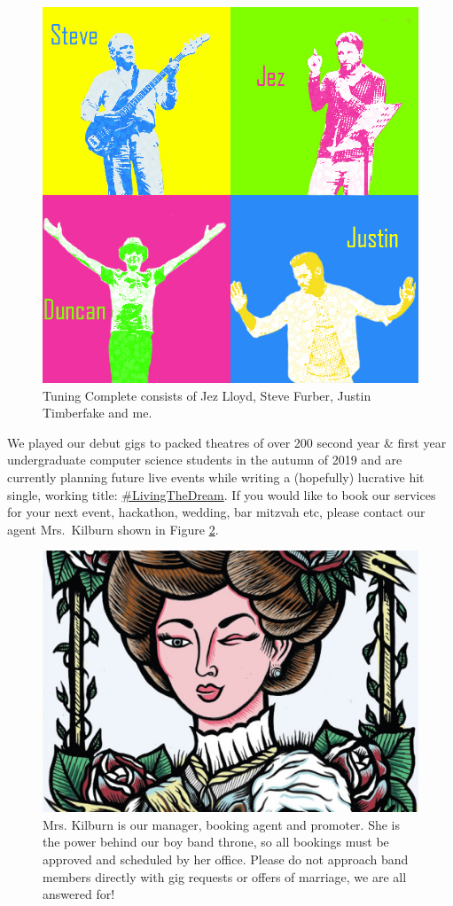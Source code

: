 \documentclass[
  12pt,
]{book}
\begin{document}
\begin{figure}

{\centering \includegraphics[width=0.7\linewidth]{images/tuning-complete} 

}

\caption{Tuning Complete consists of Jez Lloyd, Steve Furber, Justin Timberfake and me.}\label{fig:beatles-fig}
\end{figure}

We played our debut gigs to packed theatres of over 200 second year \& first year undergraduate computer science students in the autumn of 2019 and are currently planning future live events while writing a (hopefully) lucrative hit single, working title: \href{https://twitter.com/hashtag/LivingTheDream}{\#LivingTheDream}. If you would like to book our services for your next event, hackathon, wedding, bar mitzvah etc, please contact our agent Mrs.~Kilburn shown in Figure \ref{fig:mrskilburn-fig}.

\begin{figure}

{\centering \includegraphics[width=0.7\linewidth]{images/mrs-kilburn} 

}

\caption{Mrs. Kilburn is our manager, booking agent and promoter. She is the power behind our boy band throne, so all bookings must be approved and scheduled by her office. Please do not approach band members directly with gig requests or offers of marriage, we are all answered for!}\label{fig:mrskilburn-fig}
\end{figure}
\end{document}
